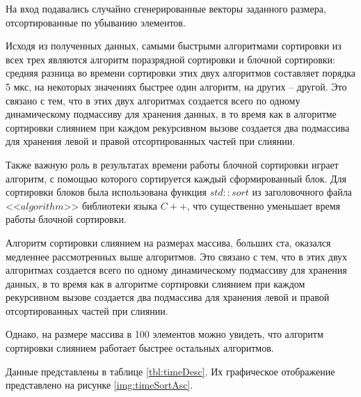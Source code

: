 На вход подавались случайно сгенерированные векторы заданного размера, отсортированные по убыванию элементов.

Исходя из полученных данных, самыми быстрыми алгоритмами сортировки из всех трех являются алгоритм поразрядной сортировки и блочной сортировки: средняя разница во времени сортировки этих двух алгоритмов составляет порядка 5 мкс, на некоторых значениях быстрее один алгоритм, на других -- другой. Это связано с тем, что в этих двух алгоритмах создается всего по одному динамическому подмассиву для хранения данных, в то время как в алгоритме сортировки слиянием при каждом рекурсивном вызове создается два подмассива для хранения левой и правой отсортированных частей при слиянии. 

Также важную роль в результатах времени работы блочной сортировки играет алгоритм, с помощью которого сортируется каждый сформированный блок. Для сортировки блоков была использована функция $std::sort$ из заголовочного файла <<$algorithm$>> библиотеки языка $C++$, что существенно уменьшает время работы блочной сортировки.

Алгоритм сортировки слиянием на размерах массива, больших ста, оказался медленнее рассмотренных выше алгоритмов. Это связано с тем, что в этих двух алгоритмах создается всего по одному динамическому подмассиву для хранения данных, в то время как в алгоритме сортировки слиянием при каждом рекурсивном вызове создается два подмассива для хранения левой и правой отсортированных частей при слиянии.

Однако, на размере массива в 100 элементов можно увидеть, что алгоритм сортировки слиянием работает быстрее остальных алгоритмов.

Данные представлены в таблице \ref{tbl:timeDesc}. Их графическое отображение представлено на рисунке \ref{img:timeSortAsc}.

